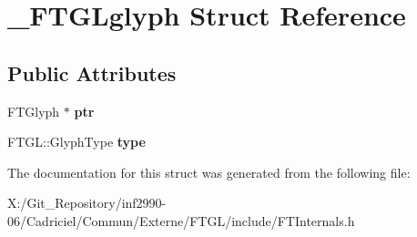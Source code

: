 \hypertarget{struct___f_t_g_lglyph}{\section{\-\_\-\-F\-T\-G\-Lglyph Struct Reference}
\label{struct___f_t_g_lglyph}
}
\subsection*{Public Attributes}
\begin{DoxyCompactItemize}
\item 
\hypertarget{struct___f_t_g_lglyph_a6bd6880c871ebdc4f78f15f698e8421b}{F\-T\-Glyph $\ast$ {\bfseries ptr}}\label{struct___f_t_g_lglyph_a6bd6880c871ebdc4f78f15f698e8421b}

\item 
\hypertarget{struct___f_t_g_lglyph_aa5d5991a60bfba8ee2a8f850553675b8}{F\-T\-G\-L\-::\-Glyph\-Type {\bfseries type}}\label{struct___f_t_g_lglyph_aa5d5991a60bfba8ee2a8f850553675b8}

\end{DoxyCompactItemize}


The documentation for this struct was generated from the following file\-:\begin{DoxyCompactItemize}
\item 
X\-:/\-Git\-\_\-\-Repository/inf2990-\/06/\-Cadriciel/\-Commun/\-Externe/\-F\-T\-G\-L/include/F\-T\-Internals.\-h\end{DoxyCompactItemize}
